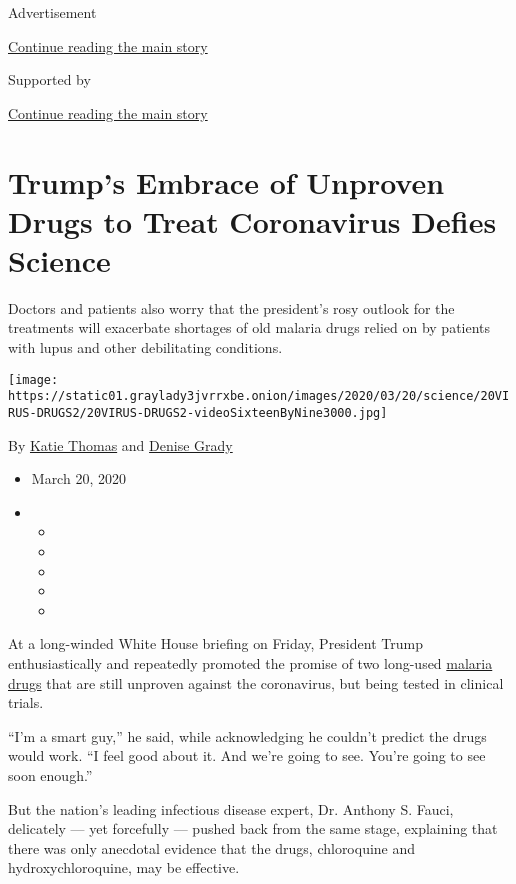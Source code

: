 Advertisement

\protect\hyperlink{after-top}{Continue reading the main story}

Supported by

\protect\hyperlink{after-sponsor}{Continue reading the main story}

\hypertarget{trumps-embrace-of-unproven-drugs-to-treat-coronavirus-defies-science}{%
\section{Trump's Embrace of Unproven Drugs to Treat Coronavirus Defies
Science}\label{trumps-embrace-of-unproven-drugs-to-treat-coronavirus-defies-science}}

Doctors and patients also worry that the president's rosy outlook for
the treatments will exacerbate shortages of old malaria drugs relied on
by patients with lupus and other debilitating conditions.

\texttt{[image: https://static01.graylady3jvrrxbe.onion/images/2020/03/20/science/20VIRUS-DRUGS2/20VIRUS-DRUGS2-videoSixteenByNine3000.jpg]}

By \href{https://www.nytimes3xbfgragh.onion/by/katie-thomas}{Katie
Thomas} and
\href{https://www.nytimes3xbfgragh.onion/by/denise-grady}{Denise Grady}

\begin{itemize}
\item
  March 20, 2020
\item
  \begin{itemize}
  \item
  \item
  \item
  \item
  \item
  \end{itemize}
\end{itemize}

At a long-winded White House briefing on Friday, President Trump
enthusiastically and repeatedly promoted the promise of two long-used
\href{https://www.nytimes3xbfgragh.onion/2020/04/01/health/hydroxychloroquine-coronavirus-malaria.html}{malaria
drugs} that are still unproven against the coronavirus, but being tested
in clinical trials.

``I'm a smart guy,'' he said, while acknowledging he couldn't predict
the drugs would work. ``I feel good about it. And we're going to see.
You're going to see soon enough.''

But the nation's leading infectious disease expert, Dr. Anthony S.
Fauci, delicately --- yet forcefully --- pushed back from the same
stage, explaining that there was only anecdotal evidence that the drugs,
chloroquine and hydroxychloroquine, may be effective.

